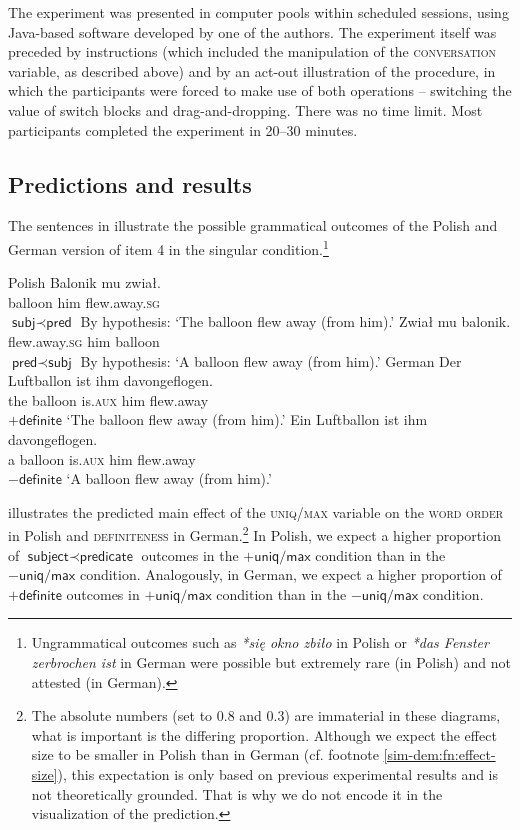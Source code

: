 \documentclass[output=paper]{langscibook}
\begin{document}
The experiment was presented in computer pools within scheduled sessions, using Java-based software developed by one of the authors. The experiment itself was preceded by instructions (which included the manipulation of the \textsc{conversation} variable, as described above) and by an act-out illustration of the procedure, in which the participants were forced to make use of both operations -- switching the value of switch blocks and drag-and-dropping. There was no time limit. Most participants completed the experiment in 20--30 minutes.

\subsection{Predictions and results}

The sentences in  illustrate the possible grammatical outcomes of the Polish and German version of item 4 in the \textsf{singular} condition.\footnote{Ungrammatical outcomes such as \textit{*się okno zbiło} in Polish or \textit{*das Fenster zerbrochen ist} in German were possible but extremely rare (in Polish) and not attested (in German).}

\ea\label{sim-dem:ex:outcome}\ea Polish
\ea\gll Balonik mu zwiał.\\
balloon him flew.away.\textsc{sg}\\\hfill $\textsf{subj}\prec\textsf{pred}$
\glt By hypothesis: `The balloon flew away (from him).'
\ex\gll Zwiał mu balonik.\\
flew.away.\textsc{sg} him balloon\\\hfill $\textsf{pred}\prec\textsf{subj}$
\glt By hypothesis: `A balloon flew away (from him).'
\z
\ex German
\ea\gll Der Luftballon ist ihm davongeflogen.\\
the balloon is.\textsc{aux} him flew.away\\\hfill$+\textsf{definite}$
\glt `The balloon flew away (from him).'
\ex\gll Ein Luftballon ist ihm davongeflogen.\\
a balloon is.\textsc{aux} him flew.away\\\hfill$-\textsf{definite}$
\glt `A balloon flew away (from him).'
\z
\z\z

\noindent{} illustrates the predicted main effect of the \textsc{uniq/max} variable on the \textsc{word order} in Polish and \textsc{definiteness} in German.\footnote{The absolute numbers (set to $0.8$ and $0.3$) are immaterial in these diagrams, what is important is the differing proportion. Although we expect the effect size to be smaller in Polish than in German (cf. footnote \ref{sim-dem:fn:effect-size}), this expectation is only based on previous experimental results \citep{Simik.Demian2020} and is not theoretically grounded. That is why we do not encode it in the visualization of the prediction.\label{sim-dem:fn:prediction}} In Polish, we expect a higher proportion of $\textsf{subject}\prec\textsf{predicate}$ outcomes in the $+\textsf{uniq/max}$ condition than in the $-\textsf{uniq/max}$ condition. Analogously, in German, we expect a higher proportion of $+\textsf{definite}$ outcomes in $+\textsf{uniq/max}$ condition than in the $-\textsf{uniq/max}$ condition.
\end{document}
